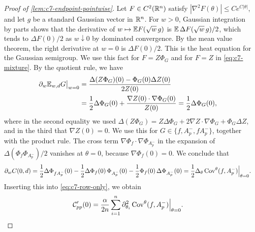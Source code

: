 \begin{proof}[Proof of \cref{lem:c7-endpoint-pointwise}]
Let $F\in C^2(\mathbb R^n)$ satisfy $|\nabla^2F(\theta)|\le Ce^{C|\theta|}$, and
let $g$ be a standard Gaussian vector in $\mathbb R^n$. For $w>0$, Gaussian
integration by parts shows that the derivative of
$w\mapsto\mathbb E F(\sqrt w\,g)$ is $\mathbb E\,\Delta F(\sqrt w\,g)/2$, which
tends to $\Delta F(0)/2$ as $w\downarrow0$ by dominated convergence.
By the mean value theorem, the right derivative at $w=0$ is
$\Delta F(0)/2$. This is the heat equation for the Gaussian
semigroup. We use this fact for $F=Z\Phi_G$ and for $F=Z$ in
\eqref{eq:c7-mixture}. By the quotient rule, we have
\[
 \begin{aligned}
 \partial_w\mathbb E_{w,d}G\big|_{w=0}
 &=\frac{\Delta(Z\Phi_G)(0)-\Phi_G(0)\Delta Z(0)}{2Z(0)}\\
 &=\frac12\Delta\Phi_G(0)+\frac{\nabla Z(0)\cdot\nabla\Phi_G(0)}{Z(0)}
 =\frac12\Delta\Phi_G(0),
 \end{aligned}
\]
where in the second equality we used
$\Delta(Z\Phi_G)=Z\Delta\Phi_G+2\nabla Z\cdot\nabla\Phi_G+\Phi_G\Delta Z$,
and in the third that $\nabla Z(0)=0$. We use this for
$G\in\{f,A_p^-,fA_p^-\}$, together with the product rule. The cross term
$\nabla\Phi_f\cdot\nabla\Phi_{A_p^-}$ in the expansion of
$\Delta(\Phi_f\Phi_{A_p^-})/2$ vanishes at $\theta=0$, because
$\nabla\Phi_f(0)=0$. We conclude that
\[
 \partial_wC(0,d)=\frac12\Delta\Phi_{fA_p^-}(0)
 -\frac12\Delta\Phi_f(0)\,\Phi_{A_p^-}(0)
 -\frac12\Phi_f(0)\,\Delta\Phi_{A_p^-}(0)
 =\frac12\Delta_\theta\operatorname{Cov}^\theta(f,A_p^-)\Big|_{\theta=0}.
\]
Inserting this into \eqref{eq:c7-row-only}, we obtain
\begin{equation}\label{eq:c7-fixedcoupling}
 \mathcal C_{pp}'(0)=\frac{\alpha}{2n}\sum_{i=1}^n
   \partial_{\theta_i}^2\operatorname{Cov}^{\theta}(f,A_p^-)\Big|_{\theta=0}.
\end{equation}


\end{proof}

